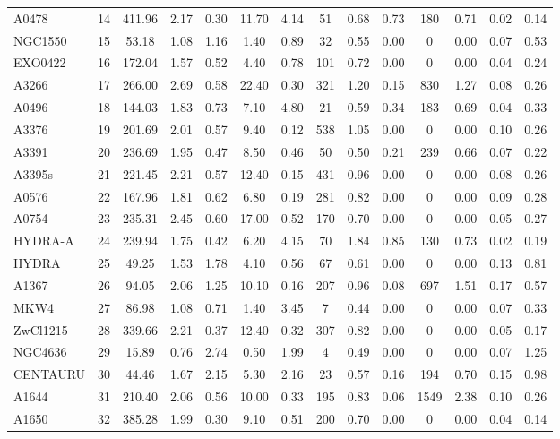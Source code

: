 \documentclass[10pt,aps,pra,reprint,amsmath,amsfonts,amssymb,showpacs,nofootinbib,floatfix]{revtex4-1}
\newcommand{\vst}{\vspace{-0.14mm}}
\begin{document}
{\begin{table}
\begin{minipage}{2.0\columnwidth}
\begin{tabular}{l c c c c c c c c c c c c c}
A0478 & 14 & 411.96 & 2.17 & 0.30 & 11.70 & 4.14 & 51 & 0.68 & 0.73 & 180 & 0.71 & 0.02 & 0.14 \vst \\
NGC1550 & 15 & 53.18 & 1.08 & 1.16 & 1.40 & 0.89 & 32 & 0.55 & 0.00 & 0 & 0.00 & 0.07 & 0.53 \vst \\
EXO0422 & 16 & 172.04 & 1.57 & 0.52 & 4.40 & 0.78 & 101 & 0.72 & 0.00 & 0 & 0.00 & 0.04 & 0.24 \vst \\
A3266 & 17 & 266.00 & 2.69 & 0.58 & 22.40 & 0.30 & 321 & 1.20 & 0.15 & 830 & 1.27 & 0.08 & 0.26 \vst \\
A0496 & 18 & 144.03 & 1.83 & 0.73 & 7.10 & 4.80 & 21 & 0.59 & 0.34 & 183 & 0.69 & 0.04 & 0.33 \vst \\
A3376 & 19 & 201.69 & 2.01 & 0.57 & 9.40 & 0.12 & 538 & 1.05 & 0.00 & 0 & 0.00 & 0.10 & 0.26 \vst \\
A3391 & 20 & 236.69 & 1.95 & 0.47 & 8.50 & 0.46 & 50 & 0.50 & 0.21 & 239 & 0.66 & 0.07 & 0.22 \vst \\
A3395s & 21 & 221.45 & 2.21 & 0.57 & 12.40 & 0.15 & 431 & 0.96 & 0.00 & 0 & 0.00 & 0.08 & 0.26 \vst \\
A0576 & 22 & 167.96 & 1.81 & 0.62 & 6.80 & 0.19 & 281 & 0.82 & 0.00 & 0 & 0.00 & 0.09 & 0.28 \vst \\
A0754 & 23 & 235.31 & 2.45 & 0.60 & 17.00 & 0.52 & 170 & 0.70 & 0.00 & 0 & 0.00 & 0.05 & 0.27 \vst \\
HYDRA-A & 24 & 239.94 & 1.75 & 0.42 & 6.20 & 4.15 & 70 & 1.84 & 0.85 & 130 & 0.73 & 0.02 & 0.19 \vst \\
HYDRA & 25 & 49.25 & 1.53 & 1.78 & 4.10 & 0.56 & 67 & 0.61 & 0.00 & 0 & 0.00 & 0.13 & 0.81 \vst \\
A1367 & 26 & 94.05 & 2.06 & 1.25 & 10.10 & 0.16 & 207 & 0.96 & 0.08 & 697 & 1.51 & 0.17 & 0.57 \vst \\
MKW4 & 27 & 86.98 & 1.08 & 0.71 & 1.40 & 3.45 & 7 & 0.44 & 0.00 & 0 & 0.00 & 0.07 & 0.33 \vst \\
ZwCl1215 & 28 & 339.66 & 2.21 & 0.37 & 12.40 & 0.32 & 307 & 0.82 & 0.00 & 0 & 0.00 & 0.05 & 0.17 \vst \\
NGC4636 & 29 & 15.89 & 0.76 & 2.74 & 0.50 & 1.99 & 4 & 0.49 & 0.00 & 0 & 0.00 & 0.07 & 1.25 \vst \\
CENTAURU & 30 & 44.46 & 1.67 & 2.15 & 5.30 & 2.16 & 23 & 0.57 & 0.16 & 194 & 0.70 & 0.15 & 0.98 \vst \\
A1644 & 31 & 210.40 & 2.06 & 0.56 & 10.00 & 0.33 & 195 & 0.83 & 0.06 & 1549 & 2.38 & 0.10 & 0.26 \vst \\
A1650 & 32 & 385.28 & 1.99 & 0.30 & 9.10 & 0.51 & 200 & 0.70 & 0.00 & 0 & 0.00 & 0.04 & 0.14 \vst \\

\end{tabular}
\end{minipage}
\end{table}}
\end{document}
